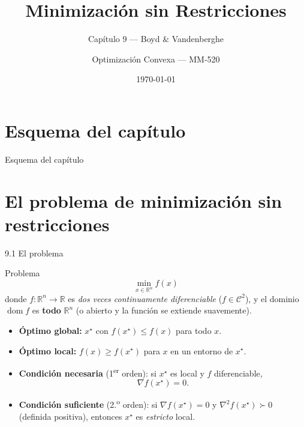 \documentclass[10pt,aspectratio=169]{beamer}
\title{Minimización sin Restricciones}
\subtitle{Capítulo 9 --- Boyd \& Vandenberghe}
\author{Optimización Convexa --- MM-520}
\date{\today}
\newcommand{\R}{\mathbb{R}}
\newcommand{\dom}{\operatorname{dom}}
\begin{document}
\begin{frame}
  \titlepage
\end{frame}

\section{Esquema del capítulo}
\begin{frame}{Esquema del capítulo}
  \tableofcontents
\end{frame}

\section{El problema de minimización sin restricciones}
\begin{frame}{9.1 El problema}
  \begin{block}{Problema}
    \[
      \min_{x \in \R^{n}} f(x)
    \]
    donde $f:\R^{n}\to\R$ es \emph{dos veces continuamente diferenciable}
    ($f \in \mathcal{C}^{2}$), y el dominio $\dom f$ es \textbf{todo} $\R^{n}$
    (o abierto y la función se extiende suavemente).
  \end{block}
  \begin{itemize}
    \item \textbf{Óptimo global:} $x^{\star}$ con $f(x^{\star}) \le f(x)$ para todo $x$.
    \item \textbf{Óptimo local:} $f(x) \ge f(x^{\star})$ para $x$ en un entorno de $x^{\star}$.
    \item \textbf{Condición necesaria} (1\textsuperscript{er} orden): si $x^{\star}$ es local y $f$ diferenciable,
          \[
            \nabla f(x^{\star}) = 0.
          \]
    \item \textbf{Condición suficiente} (2.\textsuperscript{o} orden): si $\nabla f(x^{\star}) = 0$ y
          $\nabla^{2}f(x^{\star}) \succ 0$ (definida positiva), entonces $x^{\star}$ es \emph{estricto} local.
  \end{itemize}
\end{frame}
\end{document}
